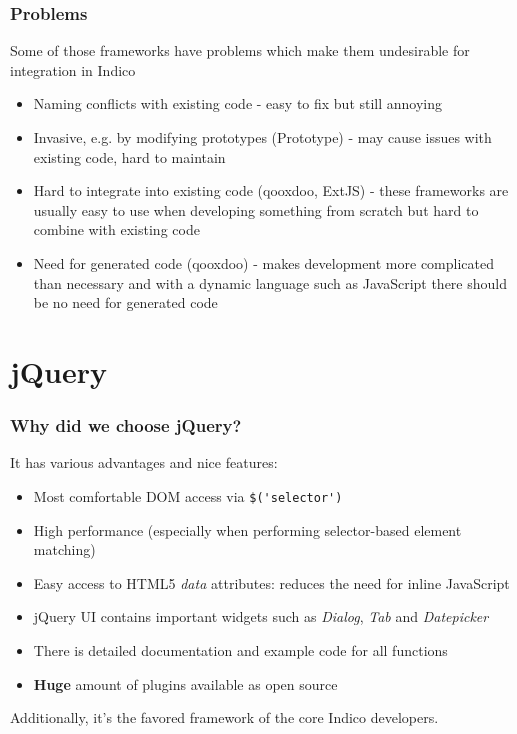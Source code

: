 \documentclass{beamer}
\begin{document}
\begin{frame}
  \frametitle{Problems}
  Some of those frameworks have problems which make them undesirable for integration in Indico
  \begin{itemize}
    \item Naming conflicts with existing code - easy to fix but still annoying
    \item Invasive, e.g. by modifying prototypes (Prototype) - may cause issues with existing code,
      hard to maintain
    \item Hard to integrate into existing code (qooxdoo, ExtJS) - these frameworks are usually easy
      to use when developing something from scratch but hard to combine with existing code
    \item Need for generated code (qooxdoo) - makes development more complicated than necessary and
      with a dynamic language such as JavaScript there should be no need for generated code
  \end{itemize}
\end{frame}

\section{jQuery}
\begin{frame}
  \frametitle{Why did we choose jQuery?}
  It has various advantages and nice features:
  \begin{itemize}
    \item Most comfortable DOM access via \lstinline{$('selector')}
    \item High performance (especially when performing selector-based element matching)
    \item Easy access to HTML5 \emph{data} attributes: reduces the need for inline JavaScript
    \item jQuery UI contains important widgets such as \emph{Dialog}, \emph{Tab} and \emph{Datepicker}
    \item There is detailed documentation and example code for all functions
    \item \textbf{Huge} amount of plugins available as open source
  \end{itemize}

  Additionally, it's the favored framework of the core Indico developers.
\end{frame}
\end{document}
